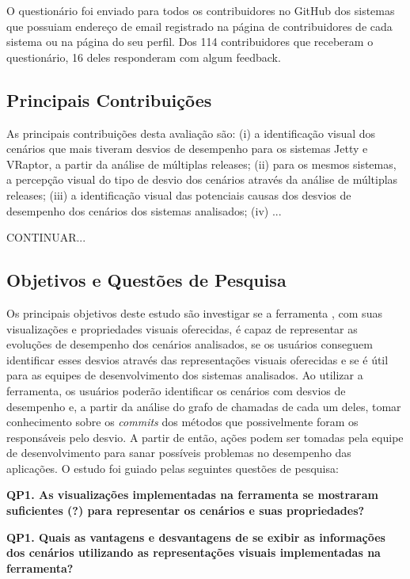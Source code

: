O questionário foi enviado para todos os contribuidores no GitHub dos sistemas que possuiam endereço de email registrado na página de contribuidores de cada sistema ou na página do seu perfil. Dos 114 contribuidores que receberam o questionário, 16 deles responderam com algum feedback.

\subsection{Principais Contribuições} \label{subsec:avaliacao-principais-contribuicoes}

As principais contribuições desta avaliação são: (i) a identificação visual dos cenários que mais tiveram desvios de desempenho para os sistemas Jetty e VRaptor, a partir da análise de múltiplas releases; (ii) para os mesmos sistemas, a percepção visual do tipo de desvio dos cenários através da análise de múltiplas releases; (iii) a identificação visual das potenciais causas dos desvios de desempenho dos cenários dos sistemas analisados; (iv) ...

{\color{red}CONTINUAR...}

\subsection{Objetivos e Questões de Pesquisa} \label{subsec:avaliacao-objetivos-questoes-pesquisa}

Os principais objetivos deste estudo são investigar se a ferramenta \textit{\toolName}, com suas visualizações e propriedades visuais oferecidas, é capaz de representar as evoluções de desempenho dos cenários analisados, se os usuários conseguem identificar esses desvios através das representações visuais oferecidas e se é útil para as equipes de desenvolvimento dos sistemas analisados. Ao utilizar a ferramenta, os usuários poderão identificar os cenários com desvios de desempenho e, a partir da análise do grafo de chamadas de cada um deles, tomar conhecimento sobre os \textit{commits} dos métodos que possivelmente foram os responsáveis pelo desvio. A partir de então, ações podem ser tomadas pela equipe de desenvolvimento para sanar possíveis problemas no desempenho das aplicações. O estudo foi guiado pelas seguintes questões de pesquisa:

\textbf{QP1. As visualizações implementadas na ferramenta se mostraram suficientes (?) para representar os cenários e suas propriedades?}

\textbf{QP1. Quais as vantagens e desvantagens de se exibir as informações dos cenários utilizando as representações visuais implementadas na ferramenta?}

